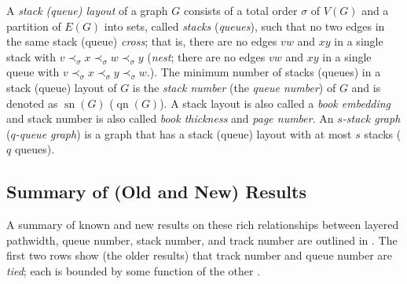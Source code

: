 \documentclass{patmorin}
\DeclareMathOperator{\sn}{sn}
\DeclareMathOperator{\qn}{qn}
\begin{document}
A \emph{stack (queue) layout} of a graph $G$ consists of a total order
$\sigma$ of $V(G)$ and a partition of $E(G)$ into  sets, called
\emph{stacks} (\emph{queues}), such that no two edges in the same
stack (queue) \emph{cross}; that is, there are no edges
$vw$ and $xy$ in a single stack with $v\prec_\sigma x\prec_\sigma w\prec_\sigma y$
(\emph{nest}; there are no edges $vw$ and $xy$ in a single queue with $v\prec_\sigma
x\prec_\sigma y\prec_\sigma w$.).  The minimum number of stacks (queues) in a
stack (queue) layout of $G$ is the \emph{stack number} (the
\emph{queue number}) of $G$ and is denoted as $\sn(G)$ ($\qn(G)$). A stack layout is also called a {\em book embedding} and stack number is also called {\em book thickness} and {\em page number}. An \emph{$s$-stack graph} (\emph{$q$-queue graph}) is a graph that has a stack (queue) layout with at most $s$ stacks ($q$ queues).

\subsection{Summary of (Old and New) Results}
A summary of known and new results on these rich relationships between layered pathwidth, queue number, stack number, and track number are outlined in .  The first two rows show (the older results) that track number and queue number are \emph{tied}; each is bounded by some function of the other \cite{dmw05,dpw04}.
\end{document}
